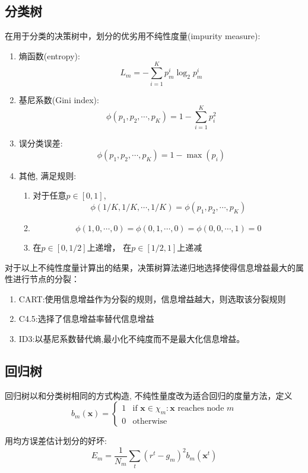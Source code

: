 \documentclass[11pt]{article}
\begin{document}
	\subsection{分类树}
		在用于分类的决策树中，划分的优劣用不纯性度量(impurity measure):
		\begin{enumerate}
			\item 熵函数(entropy): \[L_m = -\sum_{i = 1}^K p_m^i \log_2 p_m^i\]
			\item 基尼系数(Gini index): \[\phi(p_1, p_2, \cdots, p_K) = 1 - \sum_{i = 1}^K p^2_i\]
			\item 误分类误差: \[\phi(p_1, p_2, \cdots, p_K) = 1 - \max(p_i)\]
			\item 其他, 满足规则: \begin{enumerate}
									\item 对于任意$p \in [0, 1]$, \[\phi(1/K, 1/K, \cdots, 1/K) = \phi(p_1, p_2, \cdots, p_K)\]
									\item \[\phi(1, 0, \cdots, 0) = \phi(0, 1, \cdots, 0) = \phi(0, 0, \cdots, 1) = 0\]
									\item 在$p \in [0, 1/2]$上递增， 在$p \in [1/2, 1]$上递减
		 						\end{enumerate}
		 \end{enumerate}
		 
		 对于以上不纯性度量计算出的结果，决策树算法递归地选择使得信息增益最大的属性进行节点的分裂：
		 \begin{enumerate}
		 	\item CART:使用信息增益作为分裂的规则，信息增益越大，则选取该分裂规则
		 	\item C4.5:选择了信息增益率替代信息增益
		 	\item ID3:以基尼系数替代熵,最小化不纯度而不是最大化信息增益。
		 \end{enumerate}
	\subsection{回归树}
		回归树以和分类树相同的方式构造, 不纯性量度改为适合回归的度量方法，定义
		\[b_m(\textbf{x}) = \left\{\begin{array}{ll}
									1 & \textrm{if\ } \textbf{x} \in \chi_m: \textbf{x} \textrm{\ reaches\ node\ }m\\
									0 & \textrm{otherwise}
								  \end{array}\right.\]
								  
		用均方误差估计划分的好坏:\[E_m = \frac{1}{N_m} \sum_t (r^t - g_m)^2b_m(\textbf{x}^t)\]
		
\end{document}
